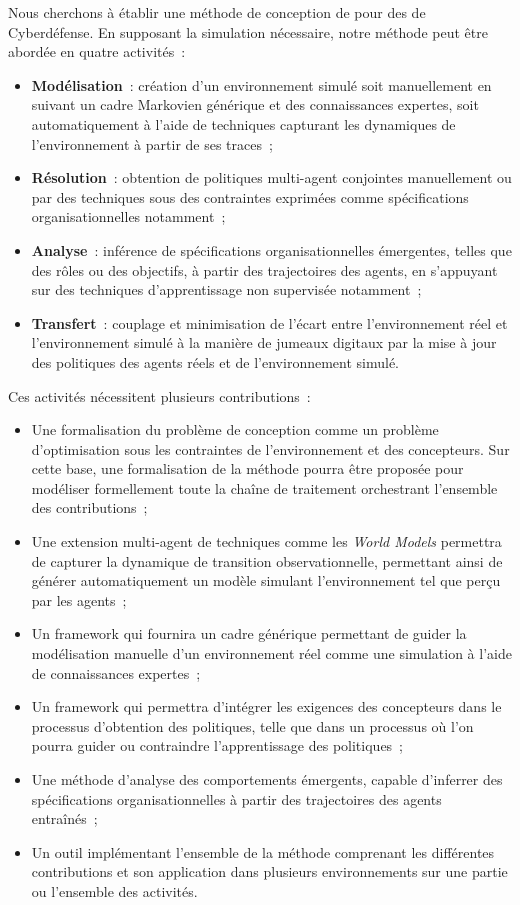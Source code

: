 \noindent
Nous cherchons à établir une méthode de conception de  pour des  de Cyberdéfense. En supposant la simulation nécessaire, notre méthode peut être abordée en quatre activités~:
\begin{itemize}
  \item \textbf{Modélisation}~: création d'un environnement simulé soit manuellement en suivant un cadre Markovien générique et des connaissances expertes, soit automatiquement à l'aide de techniques  capturant les dynamiques de l'environnement à partir de ses traces~;
  \item \textbf{Résolution}~: obtention de politiques multi-agent conjointes manuellement ou par des techniques  sous des contraintes exprimées comme spécifications organisationnelles notamment~;
  \item \textbf{Analyse}~: inférence de spécifications organisationnelles émergentes, telles que des rôles ou des objectifs, à partir des trajectoires des agents, en s'appuyant sur des techniques d'apprentissage non supervisée notamment~;
  \item \textbf{Transfert}~: couplage et minimisation de l'écart entre l'environnement réel et l'environnement simulé à la manière de jumeaux digitaux par la mise à jour des politiques des agents réels et de l'environnement simulé.
\end{itemize}

\noindent Ces activités nécessitent plusieurs contributions~:
\begin{itemize}
  \item Une formalisation du problème de conception comme un problème d'optimisation sous les contraintes de l'environnement et des concepteurs. Sur cette base, une formalisation de la méthode pourra être proposée pour modéliser formellement toute la chaîne de traitement orchestrant l'ensemble des contributions~;
  \item Une extension multi-agent de techniques  comme les \textit{World Models} permettra de capturer la dynamique de transition observationnelle, permettant ainsi de générer automatiquement un modèle simulant l'environnement tel que perçu par les agents~;
  \item Un framework qui fournira un cadre générique permettant de guider la modélisation manuelle d'un environnement réel comme une simulation à l'aide de connaissances expertes~;
  \item Un framework qui permettra d'intégrer les exigences des concepteurs dans le processus d'obtention des politiques, telle que dans un processus  où l'on pourra guider ou contraindre l'apprentissage des politiques~;
  \item Une méthode d'analyse des comportements émergents, capable d'inferrer des spécifications organisationnelles à partir des trajectoires des agents entraînés~;
  \item Un outil implémentant l'ensemble de la méthode comprenant les différentes contributions et son application dans plusieurs environnements sur une partie ou l'ensemble des activités.
\end{itemize}

